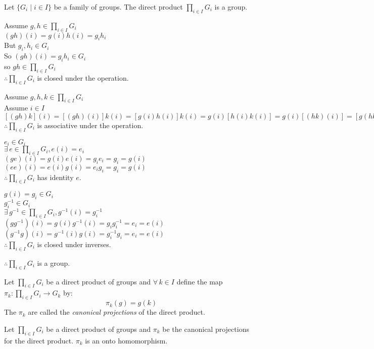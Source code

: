 \documentclass[letterpaper,12pt,fleqn]{article}
\newcommand{\xprod}[1]{\prod_{i\in I}#1_i}
\begin{document}
\begin{theorem}
  Let $\{G_i\mid i\in I\}$ be a family of groups. The direct product
  $\xprod{G}$ is a group.
\end{theorem}
\newpage
\begin{theproof}
  Assume $g,h\in\xprod{G}$ \\
  $(gh)(i)=g(i)h(i)=g_ih_i$ \\
  But $g_i,h_i\in G_i$ \\
  So $(gh)(i)=g_ih_i\in G_i$ \\
  so $gh\in\xprod{G}$ \\
  $\therefore\xprod{G}$ is closed under the operation.

  Assume $g,h,k\in\xprod{G}$ \\
  Assume $i\in I$ \\
  $[(gh)k](i)=[(gh)(i)]k(i)=[g(i)h(i)]k(i)=g(i)[h(i)k(i)]=g(i)[(hk)(i)]=
  [g(hk)](i)$ \\
  $\therefore\xprod{G}$ is associative under the operation.

  $e_i\in G_i$ \\
  $\exists\,e\in\xprod{G},e(i)=e_i$ \\
  $(ge)(i)=g(i)e(i)=g_ie_i=g_i=g(i)$ \\
  $(ee)(i)=e(i)g(i)=e_ig_i=g_i=g(i)$ \\
  $\therefore\xprod{G}$ has identity $e$.

  $g(i)=g_i\in G_i$ \\
  $g_i^{-1}\in G_i$ \\
  $\exists\,g^{-1}\in\xprod{G},g^{-1}(i)=g_i^{-1}$ \\
  $(gg^{-1})(i)=g(i)g^{-1}(i)=g_ig_i^{-1}=e_i=e(i)$ \\
  $(g^{-1}g)(i)=g^{-1}(i)g(i)=g_i^{-1}g_i=e_i=e(i)$ \\
  $\therefore\xprod{G}$ is closed under inverses.

  $\therefore\xprod{G}$ is a group.
\end{theproof}

\begin{definition}
  Let $\xprod{G}$ be a direct product of groups and $\forall\,k\in I$
  define the map $\pi_k:\xprod{G}\to G_k$ by:
  \[\pi_k(g)=g(k)\]
  The $\pi_k$ are called the \emph{canonical projections} of the direct
  product.
\end{definition}

\begin{theorem}
  Let $\xprod{G}$ be a direct product of groups and $\pi_k$ be the
  canonical projections for the direct product. $\pi_k$ is an onto
  homomorphism.
\end{theorem}
\end{document}
